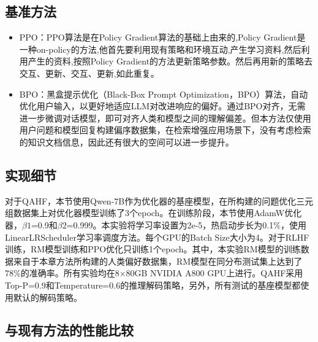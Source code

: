 \subsection{基准方法}

\begin{itemize}[topsep = 0 pt, itemsep= 0 pt, parsep=0pt, partopsep=0pt, leftmargin=36pt, itemindent=0pt, labelsep=6pt, listparindent=24pt]
	\item PPO\cite{DBLP:journals/corr/SchulmanWDRK17}：PPO算法是在Policy Gradient算法的基础上由来的,Policy Gradient是一种on-policy的方法,他首先要利用现有策略和环境互动,产生学习资料,然后利用产生的资料,按照Policy Gradient的方法更新策略参数。然后再用新的策略去交互、更新、交互、更新,如此重复。
	\item BPO\cite{DBLP:journals/corr/abs-2311-04155}：黑盒提示优化（Black-Box Prompt Optimization，BPO）算法，自动优化用户输入，以更好地适应LLM对改进响应的偏好。通过BPO对齐，无需进一步微调对话模型，即可对齐人类和模型之间的理解偏差。但本方法仅使用用户问题和模型回复构建偏序数据集，在检索增强应用场景下，没有考虑检索的知识文档信息，因此还有很大的空间可以进一步提升。
\end{itemize}

\subsection{实现细节}

对于QAHF，本节使用Qwen-7B\cite{DBLP:journals/corr/abs-2309-16609}作为优化器的基座模型，在所构建的问题优化三元组数据集上对优化器模型训练了3个epoch。在训练阶段，本节使用AdamW优化器，$\beta1$=0.9和$\beta2$=0.999。本实验将学习率设置为2e-5，热启动步长为0.1\%，使用LinearLRScheduler学习率调度方法。每个GPU的Batch Size大小为4。对于RLHF训练，RM模型训练和PPO优化只训练1个epoch。其中，本实验RM模型的训练数据来自于本章方法所构建的人类偏好数据集，RM模型在同分布测试集上达到了78\%的准确率。所有实验均在8×80GB NVIDIA A800 GPU上进行。QAHF采用Top-P=0.9和Temperature=0.6的推理解码策略，另外，所有测试的基座模型都使用默认的解码策略。

\subsection{与现有方法的性能比较}

